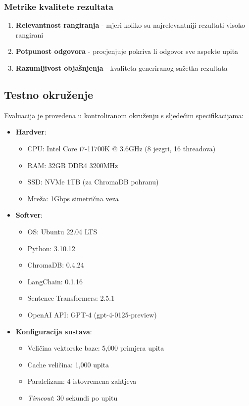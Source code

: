 \subsubsection{Metrike kvalitete rezultata}

\begin{enumerate}
    \item \textbf{Relevantnost rangiranja} - mjeri koliko su najrelevantniji rezultati visoko rangirani
    \item \textbf{Potpunost odgovora} - procjenjuje pokriva li odgovor sve aspekte upita
    \item \textbf{Razumljivost objašnjenja} - kvaliteta generiranog sažetka rezultata
\end{enumerate}

\subsection{Testno okruženje}

Evaluacija je provedena u kontroliranom okruženju s sljedećim specifikacijama:

\begin{itemize}
    \item \textbf{Hardver}:
    \begin{itemize}
        \item CPU: Intel Core i7-11700K @ 3.6GHz (8 jezgri, 16 threadova)
        \item RAM: 32GB DDR4 3200MHz
        \item SSD: NVMe 1TB (za ChromaDB pohranu)
        \item Mreža: 1Gbps simetrična veza
    \end{itemize}
    
    \item \textbf{Softver}:
    \begin{itemize}
        \item OS: Ubuntu 22.04 LTS
        \item Python: 3.10.12
        \item ChromaDB: 0.4.24
        \item LangChain: 0.1.16
        \item Sentence Transformers: 2.5.1
        \item OpenAI API: GPT-4 (gpt-4-0125-preview)
    \end{itemize}
    
    \item \textbf{Konfiguracija sustava}:
    \begin{itemize}
        \item Veličina vektorske baze: 5,000 primjera upita
        \item Cache veličina: 1,000 upita
        \item Paralelizam: 4 istovremena zahtjeva
        \item \textit{Timeout}: 30 sekundi po upitu
    \end{itemize}
\end{itemize}

